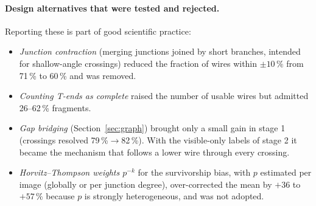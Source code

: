 \documentclass[11pt,a4paper]{article}
\begin{document}
\paragraph{Design alternatives that were tested and rejected.} Reporting these is part of good scientific practice:
\begin{itemize}[leftmargin=*,itemsep=1pt]
\item \emph{Junction contraction} (merging junctions joined by short branches, intended for shallow-angle crossings) reduced the fraction of wires within $\pm10\,\%$ from 71\,\% to 60\,\% and was removed.
\item \emph{Counting T-ends as complete} raised the number of usable wires but admitted 26--62\,\% fragments.
\item \emph{Gap bridging} (Section~\ref{sec:graph}) brought only a small gain in stage 1 (crossings resolved 79\,\%$\to$82\,\%). With the visible-only labels of stage 2 it became the mechanism that follows a lower wire through every crossing.
\item \emph{Horvitz--Thompson weights $p^{-k}$} for the survivorship bias, with $p$ estimated per image (globally or per junction degree), over-corrected the mean by $+36$ to $+57\,\%$ because $p$ is strongly heterogeneous, and was not adopted.
\end{itemize}

\end{document}
